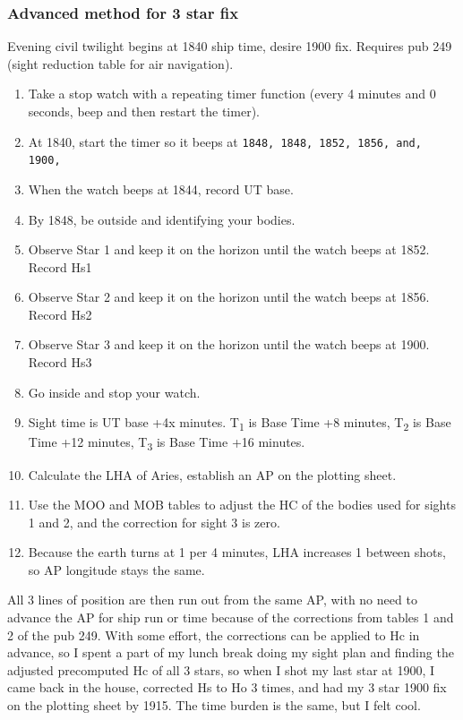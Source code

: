 \documentclass[letterpaper,12pt]{article}
\begin{document}
\subsubsection*{Advanced method for 3 star fix}
Evening civil twilight begins at 1840 ship time, desire 1900 fix.
Requires pub 249 (sight reduction table for air navigation). 
\begin{enumerate} \item Take a stop watch with a repeating timer function (every 4 minutes and 0 seconds, beep and then restart the timer).
\item At 1840, start the timer so it beeps at \texttt{1848, 1848, 1852, 1856, and, 1900,}
\item When the watch beeps at 1844, record UT base.
\item By 1848, be outside and identifying your bodies.
\item Observe Star 1 and keep it on the horizon until the watch beeps at 1852. Record Hs1
\item Observe Star 2 and keep it on the horizon until the watch beeps at 1856. Record Hs2
\item Observe Star 3 and keep it on the horizon until the watch beeps at 1900. Record Hs3
\item Go inside and stop your watch.
\item Sight time is UT base +4x minutes. T\textsubscript{1} is Base Time +8 minutes, T\textsubscript{2} is Base Time +12 minutes, T\textsubscript{3} is Base Time +16 minutes.
\item Calculate the LHA of Aries, establish an AP on the plotting sheet.
\item Use the MOO and MOB tables to adjust the HC of the bodies used for sights 1 and 2, and the correction for sight 3 is zero.
\item Because the earth turns at 1\textdegree{} per 4 minutes, LHA\aries{} increases 1\textdegree{} between shots, so AP longitude stays the same.
\end{enumerate}
All 3 lines of position are then run out from the same AP, with no need to advance the AP for ship run or time because of the corrections from tables 1 and 2 of the pub 249.
With some effort, the corrections can be applied to Hc in advance, so I spent a part of my lunch break doing my sight plan and finding the adjusted precomputed Hc of all 3 stars, so when I shot my last star at 1900, I came back in the house, corrected Hs to Ho 3 times, and had my 3 star 1900 fix on the plotting sheet by 1915.
The time burden is the same, but I felt cool.
\end{document}
